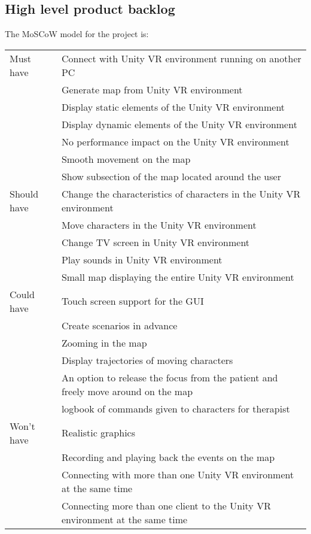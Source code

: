 \documentclass[11pt]{article}
\begin{document}
	\subsection{High level product backlog}
    The \gls{MoSCoW} model for the project is:\\[\baselineskip]
    \begin{tabular}{ l l }
		Must have
            & Connect with \gls{Unity} VR environment running on another PC \\
        	& Generate map from Unity VR environment \\
            & Display static elements of the Unity VR environment \\
            & Display dynamic elements of the Unity VR environment \\
            & No performance impact on the Unity VR environment \\
            & Smooth movement on the map \\
            & Show subsection of the map located around the user \\
    	Should have
        	& Change the characteristics of characters in the Unity VR environment \\
        	& Move characters in the Unity VR environment \\
        	& Change TV screen in Unity VR environment \\
            & Play sounds in Unity VR environment \\
            & Small map displaying the entire Unity VR environment \\
    	Could have
        	& Touch screen support for the GUI \\
        	& Create scenarios in advance \\
            & Zooming in the map \\
            & Display trajectories of moving characters \\
            & An option to release the focus from the patient and freely move around on the map \\
            & logbook of commands given to characters for therapist \\
    	Won't have
        	& Realistic graphics \\
        	& Recording and playing back the events on the map \\
            & Connecting with more than one Unity VR environment at the same time \\
            & Connecting more than one client to the Unity VR environment at the same time \\
	\end{tabular}
\end{document}
